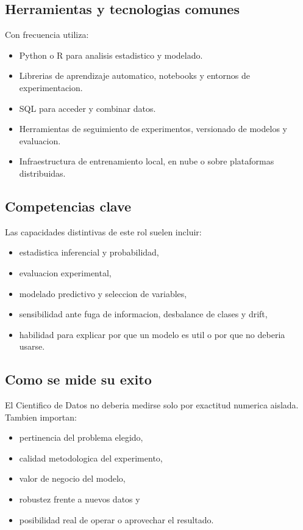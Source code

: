 \documentclass[12pt]{article}
\begin{document}
\subsection{Herramientas y tecnologias comunes}
Con frecuencia utiliza:
\begin{itemize}[leftmargin=*]
\item Python o R para analisis estadistico y modelado.
\item Librerias de aprendizaje automatico, notebooks y entornos de experimentacion.
\item SQL para acceder y combinar datos.
\item Herramientas de seguimiento de experimentos, versionado de modelos y evaluacion.
\item Infraestructura de entrenamiento local, en nube o sobre plataformas distribuidas.
\end{itemize}

\subsection{Competencias clave}
Las capacidades distintivas de este rol suelen incluir:
\begin{itemize}[leftmargin=*]
\item estadistica inferencial y probabilidad,
\item evaluacion experimental,
\item modelado predictivo y seleccion de variables,
\item sensibilidad ante fuga de informacion, desbalance de clases y drift,
\item habilidad para explicar por que un modelo es util o por que no deberia usarse.
\end{itemize}

\subsection{Como se mide su exito}
El Cientifico de Datos no deberia medirse solo por exactitud numerica aislada. Tambien importan:
\begin{itemize}[leftmargin=*]
\item pertinencia del problema elegido,
\item calidad metodologica del experimento,
\item valor de negocio del modelo,
\item robustez frente a nuevos datos y
\item posibilidad real de operar o aprovechar el resultado.
\end{itemize}
\end{document}
